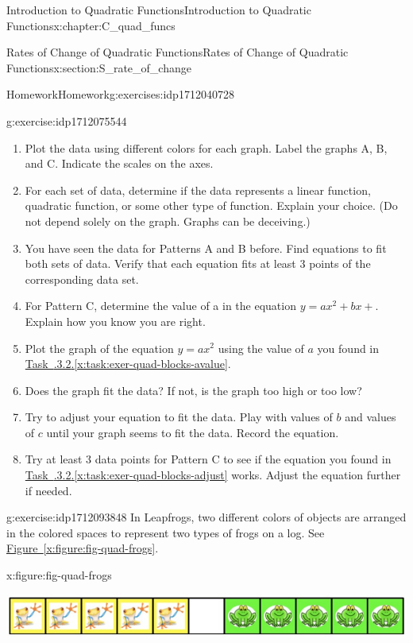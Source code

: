 \documentclass[oneside,10pt,]{book}
\newcommand{\xreffont}{\relax}
\numberwithin{equation}{chapter}
\begin{document}
\begin{chapterptx}{Introduction to Quadratic Functions}{}{Introduction to Quadratic Functions}{}{}{x:chapter:C_quad_funcs}
\begin{sectionptx}{Rates of Change of Quadratic Functions}{}{Rates of Change of Quadratic Functions}{}{}{x:section:S_rate_of_change}
\begin{exercises-subsection}{Homework}{}{Homework}{}{}{g:exercises:idp1712040728}
\begin{divisionexercise}{2}{}{}{g:exercise:idp1712075544}
\begin{enumerate}[font=\bfseries,label=(\alph*),ref=\alph*]
\begin{tableptx}{\textbf{}}{x:table:tbl-quad-block}{}
{\begin{tabular}{Accccccc}
\end{tabular}
}%
\end{tableptx}%
\item{}Plot the data using different colors for each graph. Label the graphs A, B, and C. Indicate the scales on the axes.%
\item{}For each set of data, determine if the data represents a linear function, quadratic function, or some other type of function. Explain your choice. (Do not depend solely on the graph. Graphs can be deceiving.)%
\item{}You have seen the data for Patterns A and B before. Find equations to fit both sets of data. Verify that each equation fits at least 3 points of the corresponding data set.%
\item\label{x:task:exer-quad-blocks-avalue}For Pattern C, determine the value of a in the equation \(y = ax^2 + bx + \). Explain how you know you are right.%
\item{}Plot the graph of the equation \(y = ax^2\) using the value of \(a\) you found in \hyperref[x:task:exer-quad-blocks-avalue]{Task~{\xreffont 4.4.3.2}.{\xreffont\ref{x:task:exer-quad-blocks-avalue}}}.%
\item{}Does the graph fit the data? If not, is the graph too high or too low?%
\item\label{x:task:exer-quad-blocks-adjust}Try to adjust your equation to fit the data. Play with values of \(b\) and values of \(c\) until your graph seems to fit the data. Record the equation.%
\item\label{x:task:exer-quad-blocks-try}Try at least 3 data points for Pattern C to see if the equation you found in \hyperref[x:task:exer-quad-blocks-adjust]{Task~{\xreffont 4.4.3.2}.{\xreffont\ref{x:task:exer-quad-blocks-adjust}}} works. Adjust the equation further if needed.%
\end{enumerate}
\end{divisionexercise}%
\begin{divisionexercise}{3}{}{}{g:exercise:idp1712093848}%
In Leapfrogs,\footnotemark{} two different colors of objects are arranged in the colored spaces to represent two types of frogs on a log. See \hyperref[x:figure:fig-quad-frogs]{Figure~{\xreffont\ref{x:figure:fig-quad-frogs}}}.%
\begin{figureptx}{}{x:figure:fig-quad-frogs}{}%
\begin{image}{0.05}{0.9}{0.05}%
\includegraphics[width=\linewidth]{external/quad-frogs.pdf}

\end{image}
\end{figureptx}
\end{divisionexercise}
\end{exercises-subsection}
\end{sectionptx}
\end{chapterptx}
\end{document}
